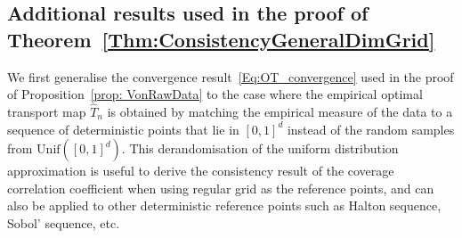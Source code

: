 \documentclass[11pt]{article}
\newtheorem{lemma}[thm]{Lemma}
\begin{document}

\subsection{Additional results used in the proof of Theorem~\ref{Thm:ConsistencyGeneralDimGrid}}
We first generalise the convergence result~\eqref{Eq:OT_convergence} used in the proof of Proposition~\ref{prop: VonRawData} to the case where the empirical optimal transport map $\hat{T}_n$ is obtained by matching the empirical measure of the data to a sequence of deterministic points that lie in $[0, 1]^d$ instead of the random samples from $\mathrm{Unif}([0, 1]^d)$. This derandomisation of the uniform distribution approximation is useful to derive the consistency result of the coverage correlation coefficient when using regular grid as the reference points, and can also be applied to other deterministic reference points such as Halton sequence, Sobol' sequence, etc. 
\end{document}
